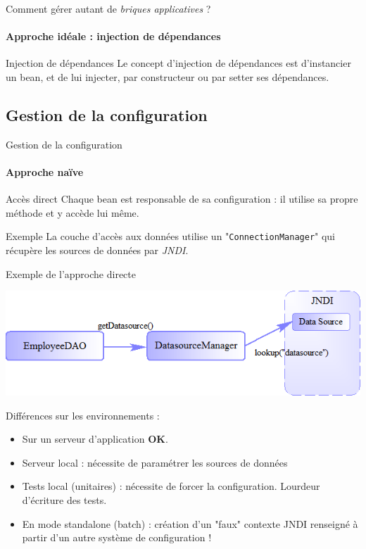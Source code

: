 \documentclass[compress]{beamer}%
\begin{document}
\begin{frame}{Comment gérer autant de \emph{briques applicatives} ?}
	\framesubtitle{Approche idéale : injection de dépendances}
	
	\begin{block}{Injection de dépendances}
	Le concept d'injection de dépendances est d'instancier un bean, et de lui injecter, par constructeur ou par setter ses dépendances.
	\end{block}	
\end{frame}


\subsection{Gestion de la configuration}

\begin{frame}{Gestion de la configuration}
	\framesubtitle{Approche naïve}
	
	\begin{block}{Accès direct}
	Chaque bean est responsable de sa configuration : il utilise sa propre méthode et y accède lui même.
	\end{block}
	
	\pause	
	\begin{exampleblock}{Exemple}
	La couche d'accès aux données utilise un "\texttt{ConnectionManager}" qui récupère les sources de données par \emph{JNDI}.
	\end{exampleblock}
	
\end{frame}

\begin{frame}{Exemple de l'approche directe}

	\includegraphics[width=\textwidth]{images/spring_datasource_without.png}
	
	\pause
	Différences sur les environnements :
	\begin{itemize}[<+->]
	\item Sur un serveur d'application \textbf{OK}.
	\item Serveur local : nécessite de paramétrer les sources de données
	\item Tests local (unitaires) : nécessite de forcer la configuration. Lourdeur d'écriture des tests.
	\item En mode standalone (batch) : création d'un "faux" contexte JNDI renseigné à partir d'un autre système de configuration !
	\end{itemize}
	
	
\end{frame}
\end{document}
